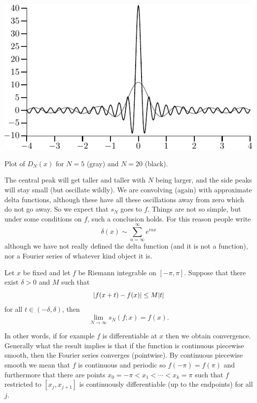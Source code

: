 \begin{myfigureht}
\includegraphics{figures/approxdeltas}
\caption{Plot of $D_N(x)$ for $N=5$ (gray) and $N=20$
(black).\label{fig:approxdeltas}}
\end{myfigureht}

The central peak will get taller and taller with $N$ being larger,
and the side peaks will stay small (but oscillate wildly).
We are convolving (again) with approximate delta functions,
although these have
all these oscillations away from zero which do not go away.  So we expect that
$s_N$ goes to $f$.  Things are not so simple, but under some conditions on
$f$, such a conclusion holds.  For this reason
people write
\begin{equation*}
\delta(x) \sim \sum_{n=\infty}^\infty e^{inx}
\end{equation*}
although we have not really defined the delta function (and it is not a
function), nor a Fourier series of whatever kind object it is.


\begin{thm}
Let $x$ be fixed and let $f$ be Riemann integrable on $[-\pi,\pi]$.  Suppose that there exist $\delta > 0$ and $M$ such that
\begin{equation*}
\lvert {f(x+t)-f(x)} \rvert \leq M \lvert {t} \rvert
\end{equation*}
for all $t \in (-\delta,\delta)$, then
\begin{equation*}
\lim_{N \to \infty} s_N(f;x) = f(x) .
\end{equation*}
\end{thm}

In other words, if for example $f$ is differentiable at $x$
then we obtain convergence.  Generally what the result implies is
that if the function is continuous
piecewise smooth, then the Fourier series converges
(pointwise).   By continuous piecewise smooth we mean that $f$
is continuous and periodic so $f(-\pi) = f(\pi)$ and furthermore
that there are points $x_0 = -\pi < x_1 < \cdots < x_k = \pi$
such that $f$ restricted to $[x_j,x_{j+1}]$
is continuously differentiable (up to the endpoints) for all $j$.

